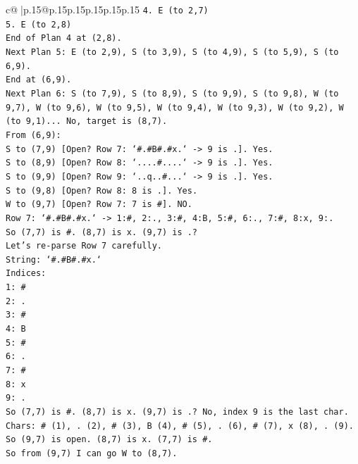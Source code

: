 \documentclass{article}
\begin{document}
{\begin{supertabular}{c@{$\;$}|p{.15\linewidth}@{}p{.15\linewidth}p{.15\linewidth}p{.15\linewidth}p{.15\linewidth}p{.15\linewidth}}
{{{\texttt{4. E (to 2,7)} \\
\texttt{5. E (to 2,8)} \\
\texttt{End of Plan 4 at (2,8).} \\
\texttt{Next Plan 5: E (to 2,9), S (to 3,9), S (to 4,9), S (to 5,9), S (to 6,9).} \\
\texttt{End at (6,9).} \\
\texttt{Next Plan 6: S (to 7,9), S (to 8,9), S (to 9,9), S (to 9,8), W (to 9,7), W (to 9,6), W (to 9,5), W (to 9,4), W (to 9,3), W (to 9,2), W (to 9,1)... No, target is (8,7).} \\
\texttt{From (6,9):} \\
\texttt{S to (7,9) {[}Open? Row 7: `\#.\#B\#.\#x.` {-}> 9 is .{]}. Yes.} \\
\texttt{S to (8,9) {[}Open? Row 8: `....\#....` {-}> 9 is .{]}. Yes.} \\
\texttt{S to (9,9) {[}Open? Row 9: `..q..\#...` {-}> 9 is .{]}. Yes.} \\
\texttt{S to (9,8) {[}Open? Row 8: 8 is .{]}. Yes.} \\
\texttt{W to (9,7) {[}Open? Row 7: 7 is \#{]}. NO.} \\
\texttt{Row 7: `\#.\#B\#.\#x.` {-}> 1:\#, 2:., 3:\#, 4:B, 5:\#, 6:., 7:\#, 8:x, 9:.} \\
\texttt{So (7,7) is \#. (8,7) is x. (9,7) is .?} \\
\texttt{Let's re{-}parse Row 7 carefully.} \\
\texttt{String: `\#.\#B\#.\#x.`} \\
\texttt{Indices:} \\
\texttt{1: \#} \\
\texttt{2: .} \\
\texttt{3: \#} \\
\texttt{4: B} \\
\texttt{5: \#} \\
\texttt{6: .} \\
\texttt{7: \#} \\
\texttt{8: x} \\
\texttt{9: .} \\
\texttt{So (7,7) is \#. (8,7) is x. (9,7) is .? No, index 9 is the last char.} \\
\texttt{Chars: \# (1), . (2), \# (3), B (4), \# (5), . (6), \# (7), x (8), . (9).} \\
\texttt{So (9,7) is open. (8,7) is x. (7,7) is \#.} \\
\texttt{So from (9,7) I can go W to (8,7).} \\
}}}
\end{supertabular}}
\end{document}
